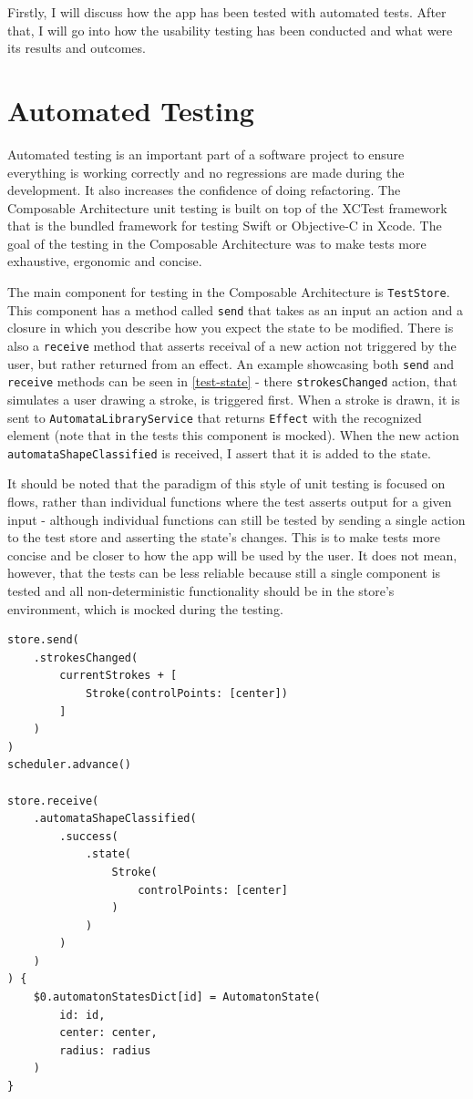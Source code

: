 Firstly, I will discuss how the app has been tested with automated tests. After that, I will go into how the usability testing has been conducted and what were its results and outcomes.

\section{Automated Testing}

Automated testing is an important part of a software project to ensure everything is working correctly and no regressions are made during the development. It also increases the confidence of doing refactoring. The Composable Architecture unit testing is built on top of the XCTest framework that is the bundled framework for testing Swift or Objective-C in Xcode. The goal of the testing in the Composable Architecture was to make tests more exhaustive, ergonomic and concise.

The main component for testing in the Composable Architecture is \lstinline{TestStore}. This component has a method called \lstinline{send} that takes as an input an action and a closure in which you describe how you expect the state to be modified. There is also a \lstinline{receive} method that asserts receival of a new action not triggered by the user, but rather returned from an effect. An example showcasing both \lstinline{send} and \lstinline{receive} methods can be seen in \ref{test-state} - there \lstinline{strokesChanged} action, that simulates a user drawing a stroke, is triggered first. When a stroke is drawn, it is sent to \lstinline{AutomataLibraryService} that returns \lstinline{Effect} with the recognized element (note that in the tests this component is mocked). When the new action \lstinline{automataShapeClassified} is received, I assert that it is added to the state.

It should be noted that the paradigm of this style of unit testing is focused on flows, rather than individual functions where the test asserts output for a given input - although individual functions can still be tested by sending a single action to the test store and asserting the state's changes. This is to make tests more concise and be closer to how the app will be used by the user. It does not mean, however, that the tests can be less reliable because still a single component is tested and all non-deterministic functionality should be in the store's environment, which is mocked during the testing. 

\begin{lstlisting}[caption={Testing creating of state}, label=test-state]
store.send(
    .strokesChanged(
        currentStrokes + [
            Stroke(controlPoints: [center])
        ]
    )
)
scheduler.advance()

store.receive(
    .automataShapeClassified(
        .success(
            .state(
                Stroke(
                    controlPoints: [center]
                )
            )
        )
    )
) {
    $0.automatonStatesDict[id] = AutomatonState(
        id: id,
        center: center,
        radius: radius
    )
}
\end{lstlisting}

